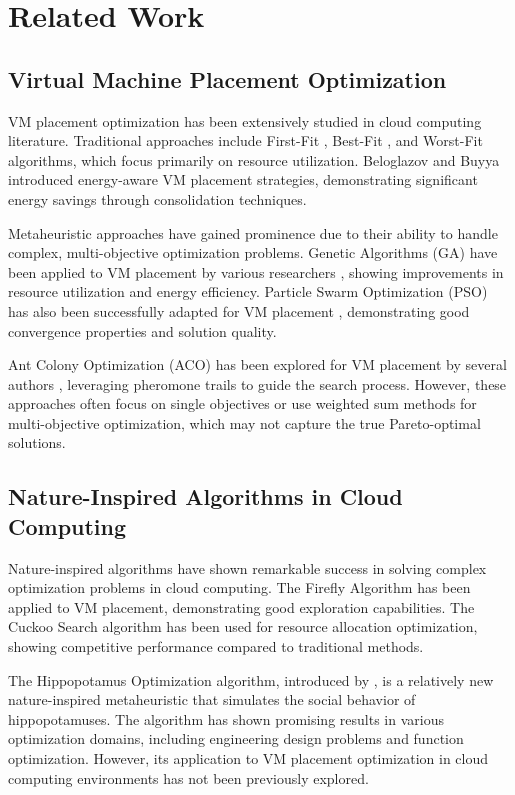 \documentclass[conference]{IEEEtran}
\begin{document}
\section{Related Work}

\subsection{Virtual Machine Placement Optimization}

VM placement optimization has been extensively studied in cloud computing literature. Traditional approaches include First-Fit \cite{firstfit2010}, Best-Fit \cite{bestfit2012}, and Worst-Fit algorithms, which focus primarily on resource utilization. Beloglazov and Buyya \cite{beloglazov2012} introduced energy-aware VM placement strategies, demonstrating significant energy savings through consolidation techniques.

Metaheuristic approaches have gained prominence due to their ability to handle complex, multi-objective optimization problems. Genetic Algorithms (GA) have been applied to VM placement by various researchers \cite{ga2015, ga2018}, showing improvements in resource utilization and energy efficiency. Particle Swarm Optimization (PSO) has also been successfully adapted for VM placement \cite{pso2016, pso2019}, demonstrating good convergence properties and solution quality.

Ant Colony Optimization (ACO) has been explored for VM placement by several authors \cite{aco2017, aco2020}, leveraging pheromone trails to guide the search process. However, these approaches often focus on single objectives or use weighted sum methods for multi-objective optimization, which may not capture the true Pareto-optimal solutions.

\subsection{Nature-Inspired Algorithms in Cloud Computing}

Nature-inspired algorithms have shown remarkable success in solving complex optimization problems in cloud computing. The Firefly Algorithm \cite{firefly2014} has been applied to VM placement, demonstrating good exploration capabilities. The Cuckoo Search algorithm \cite{cuckoo2015} has been used for resource allocation optimization, showing competitive performance compared to traditional methods.

The Hippopotamus Optimization algorithm, introduced by \cite{hippopotamus2023}, is a relatively new nature-inspired metaheuristic that simulates the social behavior of hippopotamuses. The algorithm has shown promising results in various optimization domains, including engineering design problems and function optimization. However, its application to VM placement optimization in cloud computing environments has not been previously explored.
\end{document}
